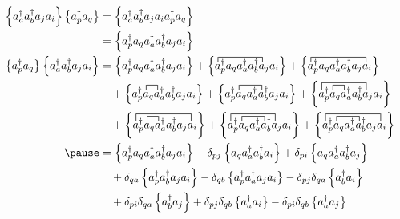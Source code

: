     \begin{align*}
        \normord{a^\dagger_a a^\dagger_b a_j a_i} \normord{a^\dagger_p a_q} &= 
            \normord{a^\dagger_a a^\dagger_b a_j a_i a^\dagger_p a_q} \\ 
        &= \normord{a^\dagger_p a_q a^\dagger_a a^\dagger_b a_j a_i} 
        \\
        \normord{a^\dagger_p a_q} \normord{a^\dagger_a a^\dagger_b a_j a_i} &= 
            \normord{a^\dagger_p a_q a^\dagger_a a^\dagger_b a_j a_i}
        + \left\{ 
        \contraction{}{a}{{}^\dagger_pa_q a^\dagger_a a^\dagger_b}{a}
        a^\dagger_p a_q a^\dagger_a a^\dagger_b a_j a_i\right\}
        + \left\{ 
        \contraction{}{a}{{}^\dagger_pa_q a^\dagger_a a^\dagger_b a_j}{a}
        a^\dagger_p a_q a^\dagger_a a^\dagger_b a_j a_i\right\} \\
        & \quad 
        + \left\{ 
        \contraction{a^\dagger_p}{a}{{}_q}{a}
        a^\dagger_p a_q a^\dagger_a a^\dagger_b a_j a_i\right\}
        + \left\{ 
        \contraction{a^\dagger_p}{a}{{}_q a^\dagger_a}{a}
        a^\dagger_p a_q a^\dagger_a a^\dagger_b a_j a_i\right\}
        + \left\{ 
        \contraction{a^\dagger_p}{a}{{}_q}{a}
        \contraction[1.5ex]{}{a}{{}^\dagger_pa_q a^\dagger_a a^\dagger_b}{a}
        a^\dagger_p a_q a^\dagger_a a^\dagger_b a_j a_i\right\} \\
        & \quad 
        + \left\{ 
        \contraction{a^\dagger_p}{a}{{}_q}{a}
        \contraction[1.5ex]{}{a}{{}^\dagger_pa_q a^\dagger_a a^\dagger_b a_j}{a}
        a^\dagger_p a_q a^\dagger_a a^\dagger_b a_j a_i\right\}
        + \left\{ 
        \contraction{a^\dagger_p}{a}{{}_q a^\dagger_a}{a}
        \contraction[1.5ex]{}{a}{{}^\dagger_pa_q a^\dagger_a a^\dagger_b}{a}
        a^\dagger_p a_q a^\dagger_a a^\dagger_b a_j a_i\right\}
        + \left\{ 
        \contraction{a^\dagger_p}{a}{{}_q a^\dagger_a}{a}
        \contraction[1.5ex]{}{a}{{}^\dagger_pa_q a^\dagger_a a^\dagger_b a_j}{a}
        a^\dagger_p a_q a^\dagger_a a^\dagger_b a_j a_i\right\} \\ \pause
        &= \normord{a^\dagger_p a_q a^\dagger_a a^\dagger_b a_j a_i}
        - \delta_{pj} \normord{a_q a^\dagger_a a^\dagger_b a_i}
        + \delta_{pi} \normord{a_q a^\dagger_a a^\dagger_b a_j} \\
        & \quad + \delta_{qa} \normord{a^\dagger_p a^\dagger_b a_j a_i}
        - \delta_{qb}\normord{a^\dagger_p a^\dagger_a a_j a_i} 
        - \delta_{pj} \delta_{qa} \normord{a^\dagger_b a_i} \\
        & \quad + \delta_{pi} \delta_{qa} \normord{a^\dagger_b a_j}
        + \delta_{pj} \delta_{qb} \normord{a^\dagger_a a_i}
        - \delta_{pi} \delta_{qb} \normord{a^\dagger_a a_j}
    \end{align*}
